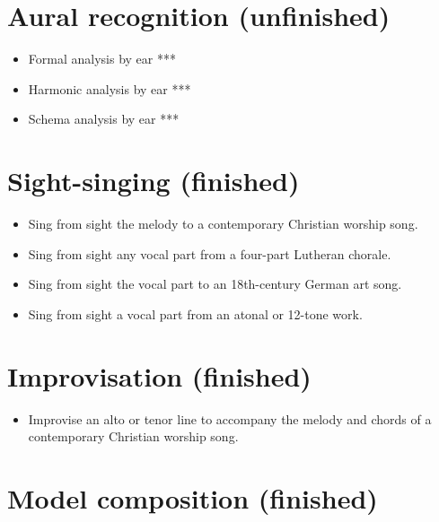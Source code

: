 \section{Aural recognition (unfinished)}
\label{auralrecognitionunfinished}

\begin{itemize}
\item Formal analysis by ear ***

\item Harmonic analysis by ear ***

\item Schema analysis by ear ***

\end{itemize}

\section{Sight-singing (finished)}
\label{sight-singingfinished}

\begin{itemize}
\item Sing from sight the melody to a contemporary Christian worship song.

\item Sing from sight any vocal part from a four-part Lutheran chorale.

\item Sing from sight the vocal part to an 18th-century German art song.

\item Sing from sight a vocal part from an atonal or 12-tone work.

\end{itemize}

\section{Improvisation (finished)}
\label{improvisationfinished}

\begin{itemize}
\item Improvise an alto or tenor line to accompany the melody and chords of a contemporary Christian worship song.

\end{itemize}

\section{Model composition (finished)}
\label{modelcompositionfinished}

